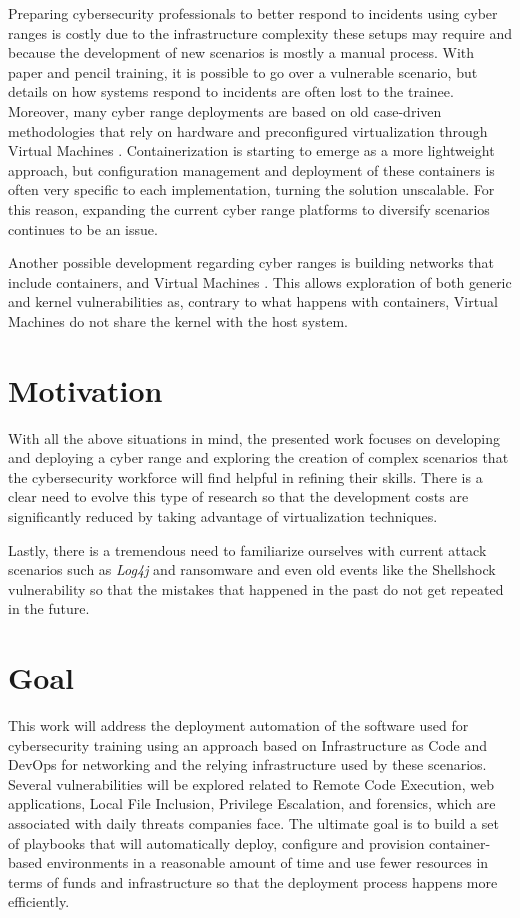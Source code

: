 Preparing cybersecurity professionals to better respond to incidents using cyber ranges is costly due to the infrastructure complexity these setups may require and because the development of new scenarios is mostly a manual process. With paper and pencil training, it is possible to go over a vulnerable scenario, but details on how systems respond to incidents are often lost to the trainee. Moreover, many cyber range deployments are based on old case-driven methodologies that rely on hardware \cite{national_cr_ref} and preconfigured virtualization through Virtual Machines \cite{cyris_ref, cytrone_ref, leaf_ref}. Containerization is starting to emerge \cite{dsp_ref, cyexec_ref} as a more lightweight approach, but configuration management and deployment of these containers is often very specific to each implementation, turning the solution unscalable. For this reason, expanding the current cyber range platforms to diversify scenarios continues to be an issue.

Another possible development regarding cyber ranges is building networks that include containers, and Virtual Machines \cite{capturing_flags_ref}. This allows exploration of both generic and kernel vulnerabilities as, contrary to what happens with containers, Virtual Machines do not share the kernel with the host system.

\section{Motivation} \label{sec:motivation}

With all the above situations in mind, the presented work focuses on developing and deploying a cyber range and exploring the creation of complex scenarios that the cybersecurity workforce will find helpful in refining their skills. There is a clear need to evolve this type of research so that the development costs are significantly reduced by taking advantage of virtualization techniques.

Lastly, there is a tremendous need to familiarize ourselves with current attack scenarios such as \textit{Log4j} and ransomware and even old events like the Shellshock vulnerability so that the mistakes that happened in the past do not get repeated in the future.

\section{Goal} \label{sec:goal}

This work will address the deployment automation of the software used for cybersecurity training using an approach based on Infrastructure as Code and DevOps for networking and the relying infrastructure used by these scenarios. Several vulnerabilities will be explored related to Remote Code Execution, web applications, Local File Inclusion, Privilege Escalation, and forensics, which are associated with daily threats companies face. The ultimate goal is to build a set of playbooks that will automatically deploy, configure and provision container-based environments in a reasonable amount of time and use fewer resources in terms of funds and infrastructure so that the deployment process happens more efficiently. 


